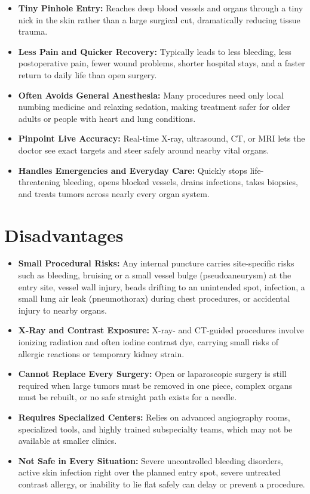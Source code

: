 \begin{itemize}
    \item \textbf{Tiny Pinhole Entry:} Reaches deep blood vessels and organs through a tiny nick in the skin rather than a large surgical cut, dramatically reducing tissue trauma.
    \item \textbf{Less Pain and Quicker Recovery:} Typically leads to less bleeding, less postoperative pain, fewer wound problems, shorter hospital stays, and a faster return to daily life than open surgery.
    \item \textbf{Often Avoids General Anesthesia:} Many procedures need only local numbing medicine and relaxing sedation, making treatment safer for older adults or people with heart and lung conditions.
    \item \textbf{Pinpoint Live Accuracy:} Real-time X-ray, ultrasound, CT, or MRI lets the doctor see exact targets and steer safely around nearby vital organs.
    \item \textbf{Handles Emergencies and Everyday Care:} Quickly stops life-threatening bleeding, opens blocked vessels, drains infections, takes biopsies, and treats tumors across nearly every organ system.
\end{itemize}

\section{Disadvantages}

\begin{itemize}
    \item \textbf{Small Procedural Risks:} Any internal puncture carries site-specific risks such as bleeding, bruising or a small vessel bulge (pseudoaneurysm) at the entry site, vessel wall injury, beads drifting to an unintended spot, infection, a small lung air leak (pneumothorax) during chest procedures, or accidental injury to nearby organs.
    \item \textbf{X-Ray and Contrast Exposure:} X-ray- and CT-guided procedures involve ionizing radiation and often iodine contrast dye, carrying small risks of allergic reactions or temporary kidney strain.
    \item \textbf{Cannot Replace Every Surgery:} Open or laparoscopic surgery is still required when large tumors must be removed in one piece, complex organs must be rebuilt, or no safe straight path exists for a needle.
    \item \textbf{Requires Specialized Centers:} Relies on advanced angiography rooms, specialized tools, and highly trained subspecialty teams, which may not be available at smaller clinics.
    \item \textbf{Not Safe in Every Situation:} Severe uncontrolled bleeding disorders, active skin infection right over the planned entry spot, severe untreated contrast allergy, or inability to lie flat safely can delay or prevent a procedure.
\end{itemize}

